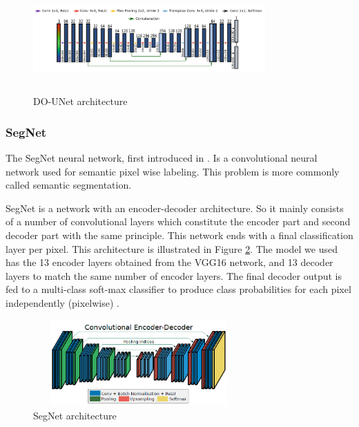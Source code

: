 \documentclass[conference]{IEEEtran}
\begin{document}
\begin{figure}[ht]
\centering
    \centerline{\includegraphics[width = 3.5in, height=1.6in]{../images/DO-UNET.png}}
    \caption{DO-UNet architecture}
    \label{fig:DO-UNET}
\end{figure}

\subsubsection{\textbf{SegNet}}

The SegNet neural network, first introduced in \cite{badrinarayanan2017segnet}. Is a convolutional neural network used for semantic pixel wise labeling. This problem is more commonly called semantic segmentation.

SegNet is a network with an encoder-decoder architecture. So it mainly consists of a number of convolutional layers which constitute the encoder part and second decoder part with the same principle. This network ends with a final classification layer per pixel. This architecture is illustrated in Figure \ref{segnet}.
The model we used has the 13 encoder layers obtained from the VGG16 network, and 13 decoder layers to match the same number of encoder layers. The final decoder output is fed to a multi-class soft-max classifier to produce class probabilities for each pixel independently (pixelwise) \cite{badrinarayanan2017segnet}.

\begin{figure}[ht]
\centering
  \vspace{-0.1in}
    \centerline{\includegraphics[width = 3.2in, height = 1.3in]{../images/segnet.png}}
    \caption{SegNet architecture}
    \label{segnet}
\end{figure}
\end{document}
